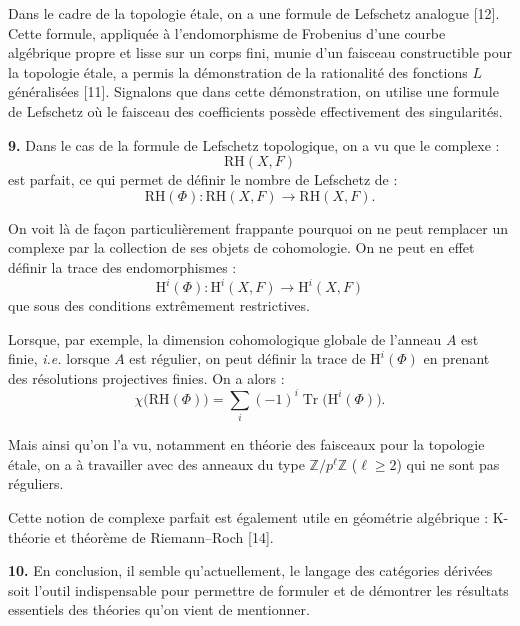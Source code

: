 %
Dans le cadre de la topologie étale, on a une formule de Lefschetz analogue
[12].
Cette formule, appliquée à l'endomorphisme de Frobenius d'une courbe
algébrique propre et lisse sur un corps fini, munie d'un faisceau
constructible pour la topologie étale, a permis la démonstration de la
rationalité des fonctions $L$ généralisées [11]. Signalons que dans cette
démonstration, on utilise une formule de Lefschetz où le faisceau des
coefficients possède effectivement des singularités.

\noindent\textbf{9.}\quad
Dans le cas de la formule de Lefschetz topologique, on a vu que le complexe :
\[
\mathrm{RH}(X,F)
\]
est parfait, ce qui permet de définir le nombre de Lefschetz de :
\[
\mathrm{RH}(\Phi)\colon
\mathrm{RH}(X,F)\longrightarrow\mathrm{RH}(X,F).
\]

On voit là de façon particulièrement frappante pourquoi on ne peut remplacer
un complexe par la collection de ses objets de cohomologie. On ne peut en
effet définir la trace des endomorphismes :
\[
\mathrm{H}^i(\Phi)\colon
\mathrm{H}^i(X,F)\longrightarrow\mathrm{H}^i(X,F)
\]
que sous des conditions extrêmement restrictives.

Lorsque, par exemple, la dimension cohomologique globale de l'anneau $A$ est
finie, \emph{i.e.} lorsque $A$ est régulier, on peut définir la trace de
$\mathrm{H}^i(\Phi)$ en prenant des résolutions projectives finies. On a
alors :
\[
\chi\bigl(\mathrm{RH}(\Phi)\bigr)
=\sum_i(-1)^i\operatorname{Tr}\bigl(\mathrm{H}^i(\Phi)\bigr).
\]

Mais ainsi qu'on l'a vu, notamment en théorie des faisceaux pour la topologie
étale, on a à travailler avec des anneaux du type
$\mathbb{Z}/p^\ell\mathbb{Z}$ ($\ell\geq 2$) qui ne sont pas réguliers.

Cette notion de complexe parfait est également utile en géométrie
algébrique : K-théorie et théorème de Riemann--Roch [14].

\noindent\textbf{10.}\quad
En conclusion, il semble qu'actuellement, le langage des catégories dérivées
soit l'outil indispensable pour permettre de formuler et de démontrer les
résultats essentiels des théories qu'on vient de mentionner.

